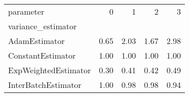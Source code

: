 \begin{tabular}{lrrrr}
\toprule
parameter &    0 &    1 &    2 &    3 \\
variance\_estimator   &      &      &      &      \\
\midrule
AdamEstimator        & 0.65 & 2.03 & 1.67 & 2.98 \\
ConstantEstimator    & 1.00 & 1.00 & 1.00 & 1.00 \\
ExpWeightedEstimator & 0.30 & 0.41 & 0.42 & 0.49 \\
InterBatchEstimator  & 1.00 & 0.98 & 0.98 & 0.94 \\
\bottomrule
\end{tabular}
